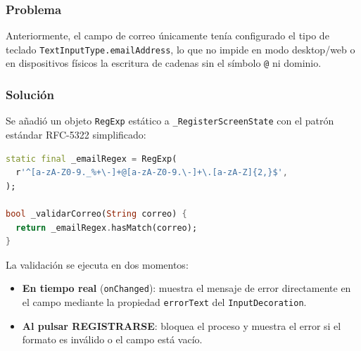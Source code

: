 \documentclass[12pt,a4paper]{article}
\begin{document}
\subsubsection{Problema}

Anteriormente, el campo de correo únicamente tenía configurado el tipo de teclado
\texttt{TextInputType.emailAddress}, lo que no impide en modo desktop/web o en dispositivos
físicos la escritura de cadenas sin el símbolo \texttt{@} ni dominio.

\subsubsection{Solución}

Se añadió un objeto \texttt{RegExp} estático a \texttt{\_RegisterScreenState} con el patrón
estándar RFC-5322 simplificado:

\begin{lstlisting}[language=Dart, caption={Regex de validación de correo en RegisterScreen}]
static final _emailRegex = RegExp(
  r'^[a-zA-Z0-9._%+\-]+@[a-zA-Z0-9.\-]+\.[a-zA-Z]{2,}$',
);

bool _validarCorreo(String correo) {
  return _emailRegex.hasMatch(correo);
}
\end{lstlisting}

La validación se ejecuta en dos momentos:

\begin{itemize}[leftmargin=2em]
  \item \textbf{En tiempo real} (\texttt{onChanged}): muestra el mensaje de error directamente
        en el campo mediante la propiedad \texttt{errorText} del \texttt{InputDecoration}.
  \item \textbf{Al pulsar REGISTRARSE}: bloquea el proceso y muestra el error si el formato
        es inválido o el campo está vacío.
\end{itemize}
\end{document}

